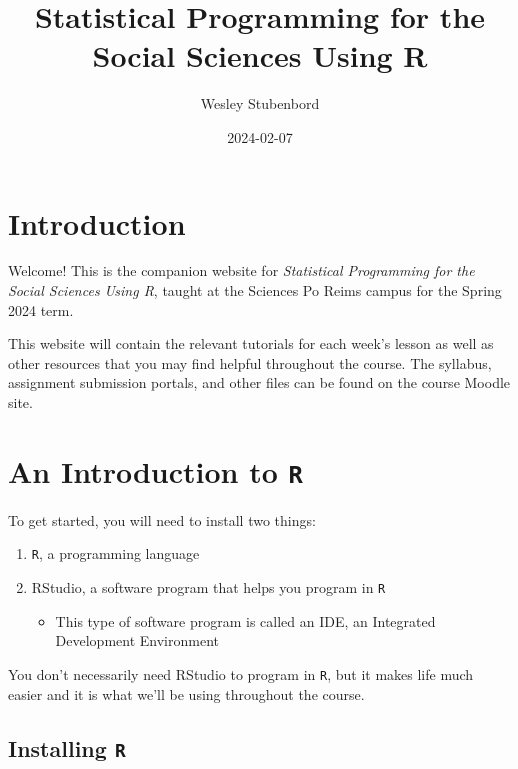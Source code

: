 \documentclass[
]{book}
\title{Statistical Programming for the Social Sciences Using R}
\author{Wesley Stubenbord}
\date{2024-02-07}
\providecommand{\tightlist}{%
  \setlength{\itemsep}{0pt}\setlength{\parskip}{0pt}}
\begin{document}
\maketitle

{
\setcounter{tocdepth}{1}
\tableofcontents
}
\hypertarget{introduction}{%
\chapter*{Introduction}\label{introduction}}

Welcome! This is the companion website for \emph{Statistical Programming for the Social Sciences Using R}, taught at the Sciences Po Reims campus for the Spring 2024 term.

This website will contain the relevant tutorials for each week's lesson as well as other resources that you may find helpful throughout the course. The syllabus, assignment submission portals, and other files can be found on the course Moodle site.

\hypertarget{an-introduction-to-r}{%
\chapter{\texorpdfstring{An Introduction to \texttt{R}}{An Introduction to R}}\label{an-introduction-to-r}}

To get started, you will need to install two things:

\begin{enumerate}
\def\labelenumi{\arabic{enumi}.}
\item
  \texttt{R}, a programming language
\item
  RStudio, a software program that helps you program in \texttt{R}

  \begin{itemize}
  \tightlist
  \item
    This type of software program is called an IDE, an Integrated Development Environment
  \end{itemize}
\end{enumerate}

You don't necessarily need RStudio to program in \texttt{R}, but it makes life much easier and it is what we'll be using throughout the course.

\hypertarget{installing-r}{%
\section{\texorpdfstring{Installing \texttt{R}}{Installing R}}\label{installing-r}}
\end{document}
